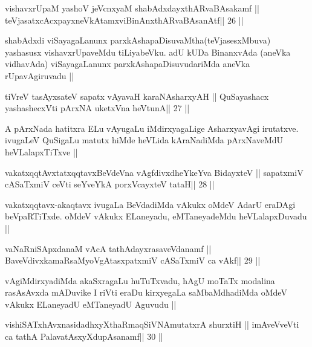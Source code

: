 \begin{shl}
vishavxrUpaM yashoV jeVcnxyaM shabAdxdayxthARvaBAsakamf ||
teVjasatxcAcxpayxneVkAtamxviBinAnxthARvaBAsanAtf\hfill || 26 ||
\end{shl}

\begin{artha}
shabAdxdi viSayagaLanunx parxkAshapaDisuvaMtha(teVjasesxMbuva) yashasusx
vishavxrUpaveMdu tiLiyabeVku. adU kUDa BinanxvAda (aneVka vidhavAda)
viSayagaLanunx parxkAshapaDisuvudariMda aneVka rUpavAgiruvadu ||
\end{artha}

\begin{shl}
tiVreV tasAyx\s\s sateV sapatx vAyavaH karaNAsharxyAH ||
QuSayashacx yashashecxVti pArxNA uketxVna heVtunA\hfill || 27 ||
\end{shl}

\begin{artha}
A pArxNada hatitxra ELu vAyugaLu iMdirxyagaLige AsharxyavAgi irutatxve.
ivugaLeV QuSigaLu matutx hiMde heVLida kAraNadiMda pArxNaveMdU
heVLalapxTiTxve ||
\end{artha}

\begin{shl}
vakatxqqtAvxtatxqqtavxBeVdeVna vAgfdivxdheYkeYva BidayxteV ||
sapatxmiV cASaTxmiV ceVti seYveYkA porxVcayxteV tataH\hfill || 28 ||
\end{shl}

\begin{artha}
vakatxqqtavx-akaqtavx ivugaLa BeVdadiMda vAkukx oMdeV AdarU eraDAgi
beVpaRTiTxde. oMdeV vAkukx ELaneyadu, eMTaneyadeMdu heVLalapxDuvadu ||
\end{artha}



\begin{shl}
vaNaRniSApxdanaM vAcA tathA\s\s dayxrasaveVdanamf ||
BaveVdivxkamaRsaMyoVgAtasxpatxmiV cASaTxmiV ca vAkf\hfill || 29 ||
\end{shl}

\begin{artha}
vAgiMdirxyadiMda akaSxragaLu huTuTxvadu, hAgU moTaTx modalina
rasAsAvxda mADuvike I riVti eraDu kirxyegaLa saMbaMdhadiMda oMdeV
vAkukx ELaneyadU eMTaneyadU Aguvudu ||
\end{artha}



\begin{shl}
vishiSATxhAvxnasidadhxyXthaRmaqSiVNAmutatxrA shurxtiH ||
imAveVveVti ca tathA PalavatAsxyXdupAsanamf\hfill || 30 ||
\end{shl}

